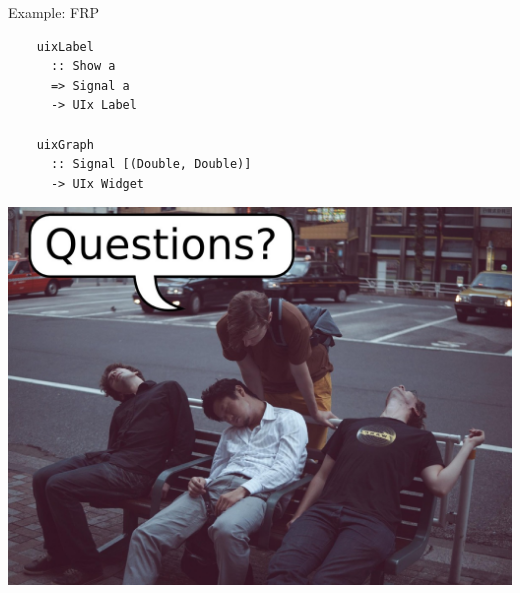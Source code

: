 \documentclass[20pt]{beamer}
\begin{document}
\begin{frame}[fragile]{Example: FRP}
    \begin{lstlisting}
    uixLabel
      :: Show a
      => Signal a
      -> UIx Label

    uixGraph
      :: Signal [(Double, Double)]
      -> UIx Widget
    \end{lstlisting}
\end{frame}


\begin{frame}[plain]
    \includegraphics[width=\textwidth]{images/questions.jpg}
\end{frame}
\end{document}
